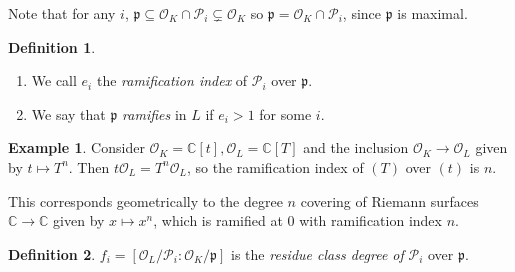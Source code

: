 \documentclass[11pt]{article}
\theoremstyle{definition}
\newtheorem{definition}{Definition}[subsection]
\newtheorem*{example}{Example}
\theoremstyle{plain}
\theoremstyle{remark}
\newcommand{\CC}{\mathbb{C}}
\newcommand{\cO}{\mathcal{O}}
\newcommand{\cP}{\mathcal{P}}
\newcommand{\fp}{\mathfrak{p}}
\begin{document}
Note that for any $i$, $\fp \subseteq \cO_K \cap \cP_i \subsetneq \cO_K$ so $\fp = \cO_K \cap \cP_i$, since $\fp$ is maximal.

\begin{definition}\label{def:11_1}\phantom{}
    \begin{enumerate}
        \item We call $e_i$ the \emph{ramification index} of $\cP_i$ over $\fp$.
        \item We say that $\fp$ \emph{ramifies} in $L$ if $e_i > 1$ for some $i$.
    \end{enumerate}
\end{definition}

\begin{example}
    Consider $\cO_K = \CC[t], \cO_L = \CC[T]$ and the inclusion $\cO_K \to \cO_L$ given by $t \mapsto T^n$. Then $t \cO_L = T^n \cO_L$, so the ramification index of $(T)$ over $(t)$ is $n$.

    This corresponds geometrically to the degree $n$ covering of Riemann surfaces $\CC \to \CC$ given by $x \mapsto x^n$, which is ramified at $0$ with ramification index $n$.
\end{example}

\begin{definition}\label{def:11_2}
    $f_i = [\cO_L / \cP_i : \cO_K / \fp]$ is the \emph{residue class degree of} $\cP_i$ over $\fp$.
\end{definition}
\end{document}
